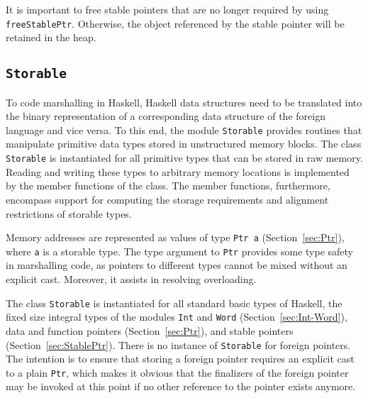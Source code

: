 \documentclass[a4paper,twoside]{article}
\newcommand{\code}[1]{\texttt{#1}}      %
\begin{document}
It is important to free stable pointers that are no longer required by using
\code{freeStablePtr}.  Otherwise, the object referenced by the stable pointer
will be retained in the heap.


\subsection{\code{Storable}}
\label{sec:Storable}

To code marshalling in Haskell, Haskell data structures need to be translated
into the binary representation of a corresponding data structure of the
foreign language and vice versa.  To this end, the module \code{Storable}
provides routines that manipulate primitive data types stored in unstructured
memory blocks.  The class \code{Storable} is instantiated for all primitive
types that can be stored in raw memory.  Reading and writing these types to
arbitrary memory locations is implemented by the member functions of the
class.  The member functions, furthermore, encompass support for computing the
storage requirements and alignment restrictions of storable types.

Memory addresses are represented as values of type \code{Ptr a}
(Section~\ref{sec:Ptr}), where \code{a} is a storable type.  The type argument
to \code{Ptr} provides some type safety in marshalling code, as pointers to
different types cannot be mixed without an explicit cast.  Moreover, it
assists in resolving overloading.

The class \code{Storable} is instantiated for all standard basic types of
Haskell, the fixed size integral types of the modules \code{Int} and
\code{Word} (Section~\ref{sec:Int-Word}), data and function pointers
(Section~\ref{sec:Ptr}), and stable pointers (Section~\ref{sec:StablePtr}).
There is no instance of \code{Storable} for foreign pointers.  The intention
is to ensure that storing a foreign pointer requires an explicit cast to a
plain \code{Ptr}, which makes it obvious that the finalizers of the foreign
pointer may be invoked at this point if no other reference to the pointer
exists anymore.
\end{document}
